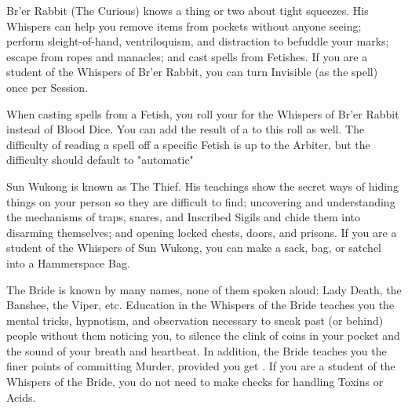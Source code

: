 {    

    Br'er Rabbit (The Curious) knows a thing or two about tight squeezes.  His Whispers can help you remove items from pockets without anyone seeing; perform sleight-of-hand, ventriloquism, and distraction to befuddle your marks; escape from ropes and manacles; and cast spells from Fetishes.  If you are a student of the Whispers of Br'er Rabbit, you can turn Invisible (as the spell) once per Session.

    When casting spells from a Fetish, you roll your \KNAVE for the Whispers of Br'er Rabbit instead of Blood Dice.  You can add the result of a \LUCK to this roll as well. The difficulty of reading a spell off a specific Fetish is up to the Arbiter, but the difficulty should default to "automatic"  


    Sun Wukong is known as The Thief.  His teachings show the secret ways of hiding things on your person so they are difficult to find; uncovering and understanding the mechanisms of traps, snares, and Inscribed Sigils and chide them into disarming themselves; and opening locked chests, doors, and prisons.  If you are a student of the Whispers of Sun Wukong, you can make a sack, bag, or satchel into a Hammerspace Bag.




    The Bride is known by many names, none of them spoken aloud:  Lady Death, the Banshee, the Viper, etc.  Education in the Whispers of the Bride teaches you the mental tricks, hypnotism, and observation necessary to sneak past (or behind) people without them noticing you, to silence the clink of coins in your pocket and the sound of your breath and heartbeat. In addition, the Bride teaches you the finer points of committing Murder, provided you get  . If you are a student of the Whispers of the Bride, you do not need to make \DEX checks for handling Toxins or Acids.

}
